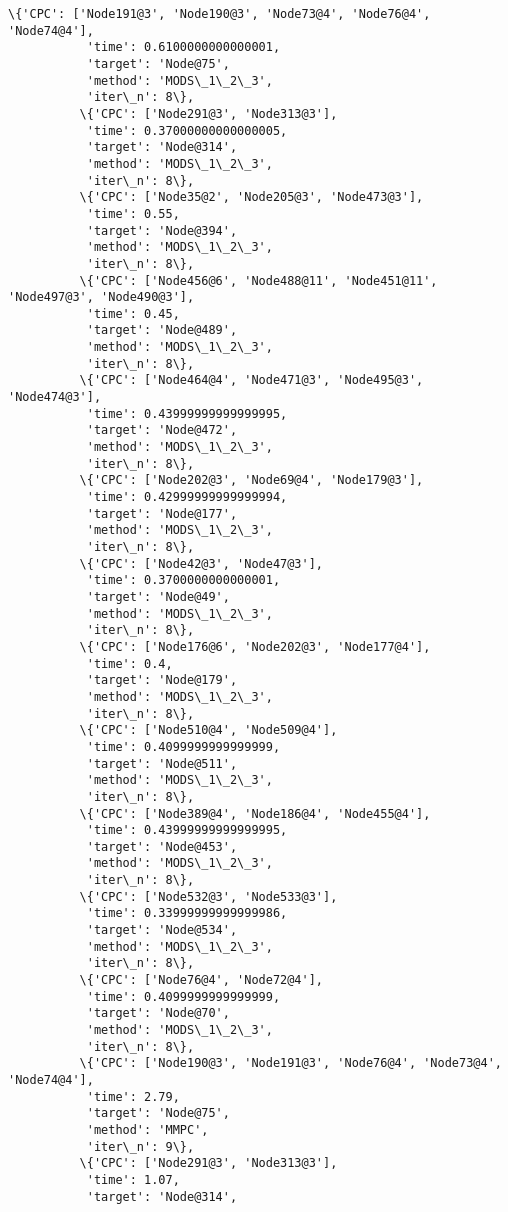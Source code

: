 \documentclass[11pt]{article}
\begin{document}
\begin{Verbatim}[commandchars=\\\{\}]
          \{'CPC': ['Node191@3', 'Node190@3', 'Node73@4', 'Node76@4', 'Node74@4'],
           'time': 0.6100000000000001,
           'target': 'Node@75',
           'method': 'MODS\_1\_2\_3',
           'iter\_n': 8\},
          \{'CPC': ['Node291@3', 'Node313@3'],
           'time': 0.37000000000000005,
           'target': 'Node@314',
           'method': 'MODS\_1\_2\_3',
           'iter\_n': 8\},
          \{'CPC': ['Node35@2', 'Node205@3', 'Node473@3'],
           'time': 0.55,
           'target': 'Node@394',
           'method': 'MODS\_1\_2\_3',
           'iter\_n': 8\},
          \{'CPC': ['Node456@6', 'Node488@11', 'Node451@11', 'Node497@3', 'Node490@3'],
           'time': 0.45,
           'target': 'Node@489',
           'method': 'MODS\_1\_2\_3',
           'iter\_n': 8\},
          \{'CPC': ['Node464@4', 'Node471@3', 'Node495@3', 'Node474@3'],
           'time': 0.43999999999999995,
           'target': 'Node@472',
           'method': 'MODS\_1\_2\_3',
           'iter\_n': 8\},
          \{'CPC': ['Node202@3', 'Node69@4', 'Node179@3'],
           'time': 0.42999999999999994,
           'target': 'Node@177',
           'method': 'MODS\_1\_2\_3',
           'iter\_n': 8\},
          \{'CPC': ['Node42@3', 'Node47@3'],
           'time': 0.3700000000000001,
           'target': 'Node@49',
           'method': 'MODS\_1\_2\_3',
           'iter\_n': 8\},
          \{'CPC': ['Node176@6', 'Node202@3', 'Node177@4'],
           'time': 0.4,
           'target': 'Node@179',
           'method': 'MODS\_1\_2\_3',
           'iter\_n': 8\},
          \{'CPC': ['Node510@4', 'Node509@4'],
           'time': 0.4099999999999999,
           'target': 'Node@511',
           'method': 'MODS\_1\_2\_3',
           'iter\_n': 8\},
          \{'CPC': ['Node389@4', 'Node186@4', 'Node455@4'],
           'time': 0.43999999999999995,
           'target': 'Node@453',
           'method': 'MODS\_1\_2\_3',
           'iter\_n': 8\},
          \{'CPC': ['Node532@3', 'Node533@3'],
           'time': 0.33999999999999986,
           'target': 'Node@534',
           'method': 'MODS\_1\_2\_3',
           'iter\_n': 8\},
          \{'CPC': ['Node76@4', 'Node72@4'],
           'time': 0.4099999999999999,
           'target': 'Node@70',
           'method': 'MODS\_1\_2\_3',
           'iter\_n': 8\},
          \{'CPC': ['Node190@3', 'Node191@3', 'Node76@4', 'Node73@4', 'Node74@4'],
           'time': 2.79,
           'target': 'Node@75',
           'method': 'MMPC',
           'iter\_n': 9\},
          \{'CPC': ['Node291@3', 'Node313@3'],
           'time': 1.07,
           'target': 'Node@314',

\end{Verbatim}
\end{document}

